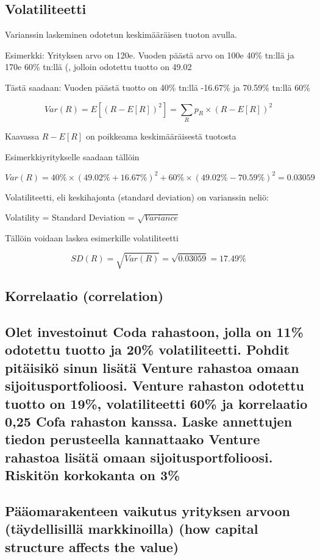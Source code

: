 \documentclass[a4paper]{article}
\begin{document}
\subsection{Volatiliteetti}

Varianssin laskeminen odotetun keskimääräisen tuoton avulla.

Esimerkki: Yrityksen arvo on 120e. Vuoden päästä arvo on 100e 40\% tn:llä ja 170e 60\% tn:llä (, jolloin odotettu tuotto on 49.02%

Tästä saadaan: Vuoden päästä tuotto on 40\% tn:llä -16.67\% ja 70.59\% tn:llä 60\%

\[
Var(R) = E[(R - E[R])^2] = \sum_R{p_R \times (R - E[R])^2}
\]

Kaavassa $R - E[R]$ on poikkeama keskimääräisestä tuotosta

Esimerkkiyritykselle saadaan tällöin

\[
Var(R) = 40\% \times (49.02\% + 16.67\%)^2 + 60\% \times (49.02\% - 70.59\%)^2 = 0.03059
\]

Volatiliteetti, eli keskihajonta (standard deviation) on varianssin neliö:

Volatility = Standard Deviation = $\sqrt{Variance}$

Tällöin voidaan laskea esimerkille volatiliteetti

\[
SD(R) = \sqrt{Var(R)} = \sqrt{0.03059} = 17.49\%
\]

\subsection{Korrelaatio (correlation)}



\subsection{Olet investoinut Coda rahastoon, jolla on 11\% odotettu tuotto ja 20\% volatiliteetti. Pohdit pitäisikö sinun lisätä Venture rahastoa omaan sijoitusportfolioosi. Venture rahaston odotettu tuotto on 19\%, volatiliteetti 60\% ja korrelaatio 0,25 Cofa rahaston kanssa. Laske annettujen tiedon perusteella kannattaako Venture rahastoa lisätä omaan sijoitusportfolioosi. Riskitön korkokanta on 3\%}

\subsection{Pääomarakenteen vaikutus yrityksen arvoon (täydellisillä markkinoilla) (how capital structure affects the value)}
\end{document}

